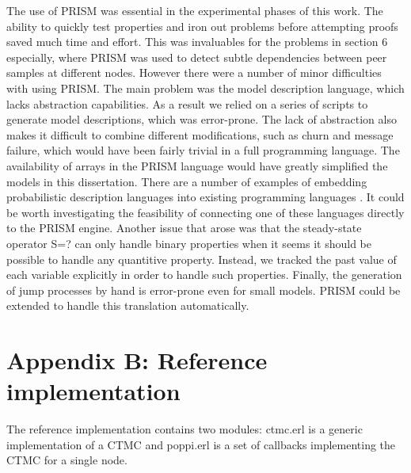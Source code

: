 \documentclass[a4paper,10pt]{article}
\newcommand{\code}[1]{
  \footnotesize
  
}
\begin{document}
The use of PRISM was essential in the experimental phases of this work. The ability to quickly test properties and iron out problems before attempting proofs saved much time and effort. This was invaluables for the problems in section 6 especially, where PRISM was used to detect subtle dependencies between peer samples at different nodes. However there were a number of minor difficulties with using PRISM. The main problem was the model description language, which lacks abstraction capabilities. As a result we relied on a series of scripts to generate model descriptions, which was error-prone. The lack of abstraction also makes it difficult to combine different modifications, such as churn and message failure, which would have been fairly trivial in a full programming language. The availability of arrays in the PRISM language would have greatly simplified the models in this dissertation. There are a number of examples of embedding probabilistic description languages into existing programming languages \cite{pfp, ocaml_cont}. It could be worth investigating the feasibility of connecting one of these languages directly to the PRISM engine. Another issue that arose was that the steady-state operator S=? can only handle binary properties when it seems it should be possible to handle any quantitive property. Instead, we tracked the past value of each variable explicitly in order to handle such properties. Finally, the generation of jump processes by hand is error-prone even for small models. PRISM could be extended to handle this translation automatically.

\clearpage

\section*{Appendix B: Reference implementation}

The reference implementation contains two modules: ctmc.erl is a generic implementation of a CTMC and poppi.erl is a set of callbacks implementing the CTMC for a single node.

\clearpage
\code{../src/ctmc.erl}
\clearpage
\code{../src/poppi.erl}
\end{document}
